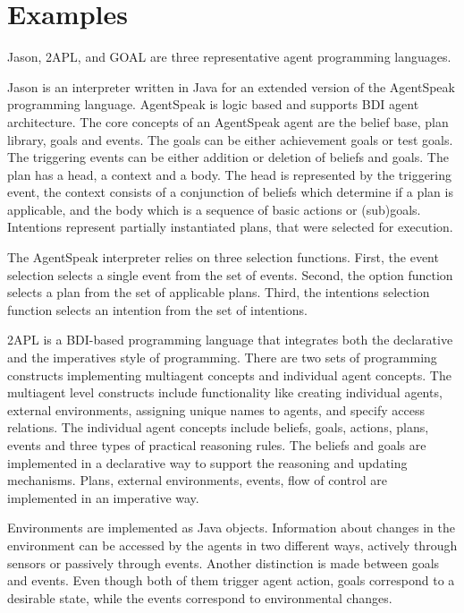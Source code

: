 \documentclass[a4paper,12pt,oneside,fleqn]{book} %
\begin{document}
\section{Examples} %
Jason, 2APL, and GOAL are three representative agent programming languages.

Jason is an interpreter written in Java for an extended version of the
AgentSpeak programming language. AgentSpeak is logic based and supports BDI
agent architecture. The core concepts of an AgentSpeak agent are the belief
base, plan library, goals and events. The goals can be either achievement
goals or test goals. The triggering events can be either addition or
deletion of beliefs and goals. The plan has a head, a context and a body.
The head is represented by the triggering event, the context consists of a
conjunction of beliefs which determine if a plan is applicable, and the
body which is a sequence of basic actions or (sub)goals. Intentions
represent partially instantiated plans, that were selected for execution.

The AgentSpeak interpreter relies on three selection functions. First, the
event selection selects a single event from the set of events. Second, the
option function selects a plan from the set of applicable plans. Third, the
intentions selection function selects an intention from the set of
intentions.

2APL is a BDI-based programming language that integrates both the
declarative and the imperatives style of programming. There are two sets of
programming constructs implementing multiagent concepts and individual
agent concepts. The multiagent level constructs include functionality like
creating individual agents, external environments, assigning unique names
to agents, and specify access relations. The individual agent concepts
include beliefs, goals, actions, plans, events and three types of practical
reasoning rules. The beliefs and goals are implemented in a declarative way
to support the reasoning and updating mechanisms. Plans, external
environments, events, flow of control are implemented in an imperative way.

Environments are implemented as Java objects. Information about changes in
the environment can be accessed by the agents in two different ways,
actively through sensors or passively through events. Another distinction
is made between goals and events. Even though both of them trigger agent
action, goals correspond to a desirable state, while the events correspond
to environmental changes.
\end{document}
